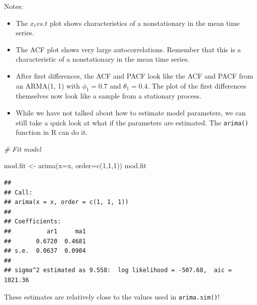 \documentclass[
]{book}
\newenvironment{Shaded}{\begin{snugshade}}{\end{snugshade}}
\newcommand{\AttributeTok}[1]{\textcolor[rgb]{0.77,0.63,0.00}{#1}}
\newcommand{\CommentTok}[1]{\textcolor[rgb]{0.56,0.35,0.01}{\textit{#1}}}
\newcommand{\DecValTok}[1]{\textcolor[rgb]{0.00,0.00,0.81}{#1}}
\newcommand{\FunctionTok}[1]{\textcolor[rgb]{0.00,0.00,0.00}{#1}}
\newcommand{\NormalTok}[1]{#1}
\newcommand{\OtherTok}[1]{\textcolor[rgb]{0.56,0.35,0.01}{#1}}
\newcommand{\SpecialCharTok}[1]{\textcolor[rgb]{0.00,0.00,0.00}{#1}}
\providecommand{\tightlist}{%
  \setlength{\itemsep}{0pt}\setlength{\parskip}{0pt}}
\theoremstyle{definition}
\theoremstyle{definition}
\theoremstyle{definition}
\theoremstyle{definition}
\theoremstyle{remark}
\begin{document}
Notes:

\begin{itemize}
\tightlist
\item
  The \(x_t vs. t\) plot shows characteristics of a nonstationary in the mean time series.\\
\item
  The ACF plot shows very large autocorrelations. Remember that this is a characteristic of a nonstationary in the mean time series.\\
\item
  After first differences, the ACF and PACF look like the ACF and PACF from an ARMA(1, 1) with \(\phi_1 = 0.7\) and \(\theta_1 = 0.4\). The plot of the first differences themselves now look like a sample from a stationary process.\\
\item
  While we have not talked about how to estimate model parameters, we can still take a quick look at what if the parameters are estimated. The \texttt{arima()} function in R can do it.
\end{itemize}

\begin{Shaded}
\begin{Highlighting}[]
\CommentTok{\# Fit model}

\NormalTok{mod.fit }\OtherTok{\textless{}{-}} \FunctionTok{arima}\NormalTok{(}\AttributeTok{x=}\NormalTok{x, }\AttributeTok{order=}\FunctionTok{c}\NormalTok{(}\DecValTok{1}\NormalTok{,}\DecValTok{1}\NormalTok{,}\DecValTok{1}\NormalTok{))}
\NormalTok{mod.fit}
\end{Highlighting}
\end{Shaded}

\begin{verbatim}
## 
## Call:
## arima(x = x, order = c(1, 1, 1))
## 
## Coefficients:
##          ar1     ma1
##       0.6720  0.4681
## s.e.  0.0637  0.0904
## 
## sigma^2 estimated as 9.558:  log likelihood = -507.68,  aic = 1021.36
\end{verbatim}

These estimates are relatively close to the values used in \texttt{arima.sim()}!

\begin{Shaded}
\end{Shaded}
\end{document}
